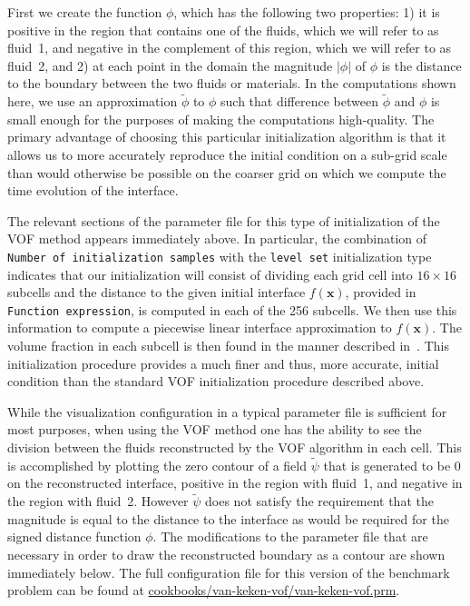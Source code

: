 First we create the function $\phi$, which has the following two properties: 1) it is positive 
in the region that contains one of the fluids, which we will refer to as fluid~1, and negative 
in the complement of this region, which we will refer to as fluid~2, and 2) at each point in 
the domain the magnitude $| \phi |$ of $\phi$ is the distance to the boundary between the 
two fluids or materials.
In the computations shown here, we use an approximation $\tilde{\phi}$ to $\phi$ such that   
difference between $\tilde{\phi}$ and $\phi$ is small enough for the purposes of making the 
computations high-quality.
The primary advantage of choosing this particular initialization algorithm is that it allows us 
to more accurately reproduce the initial condition on a sub-grid scale than would otherwise be 
possible on the coarser grid on which we compute the time evolution of the interface. 




The relevant sections of the parameter file for this type of initialization of the VOF method 
appears immediately above.
In particular, the combination of \texttt{Number of initialization samples} with the 
\texttt{level set} initialization type indicates that our initialization will consist of 
dividing each grid cell into $16 \times 16$ subcells and the distance to the given initial 
interface $f(\mathbf x)$, provided in \texttt{Function expression}, is computed in each of the 256 
subcells.
We then use this information to compute a piecewise linear interface approximation to $f(\mathbf x)$.
The volume fraction in each subcell is then found in the manner described 
in~\cite{JMR:2019,JMR-EGP:2019}.
This initialization procedure provides a much finer and thus, more accurate, initial condition 
than the standard VOF initialization procedure described above.

While the visualization configuration in a typical parameter file is sufficient for most 
purposes, when using the VOF method one has the ability to see the division between the fluids 
reconstructed by the VOF algorithm in each cell.
This is accomplished by plotting the zero contour of a field $\tilde\psi$ that
is generated to be $0$ on the reconstructed interface, positive in the region
with fluid~1, and negative in the region with fluid~2.
However $\tilde{\psi}$ does not satisfy the requirement that the magnitude is
equal to the distance to the interface as would be required for the signed
distance function $\phi$.
The modifications to the parameter file that are necessary in order to draw the reconstructed 
boundary as a contour are shown immediately below.
The full configuration file for this version of the benchmark problem can be found at 
\url{cookbooks/van-keken-vof/van-keken-vof.prm}.

